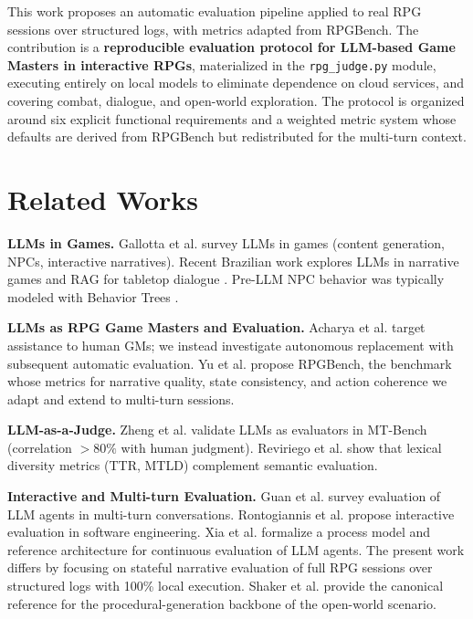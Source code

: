 \documentclass[12pt]{article}
\begin{document}
This work proposes an automatic evaluation pipeline applied to real RPG sessions over structured logs, with metrics adapted from RPGBench. The contribution is a \textbf{reproducible evaluation protocol for LLM-based Game Masters in interactive RPGs}, materialized in the \texttt{rpg\_judge.py} module, executing entirely on local models to eliminate dependence on cloud services, and covering combat, dialogue, and open-world exploration. The protocol is organized around six explicit functional requirements and a weighted metric system whose defaults are derived from RPGBench but redistributed for the multi-turn context.

\section{Related Works}
\label{sec:related}

\textbf{LLMs in Games.}
Gallotta et al. \cite{gallotta:2024} survey LLMs in games (content generation, NPCs, interactive narratives). Recent Brazilian work explores LLMs in narrative games \cite{sbgames:llm:2025} and RAG for tabletop dialogue \cite{sbgames:tabletop:2025}. Pre-LLM NPC behavior was typically modeled with Behavior Trees \cite{agis:2020}.

\textbf{LLMs as RPG Game Masters and Evaluation.}
Acharya et al. \cite{acharya:2023} target assistance to human GMs; we instead investigate autonomous replacement with subsequent automatic evaluation. Yu et al. \cite{yu:2025} propose RPGBench, the benchmark whose metrics for narrative quality, state consistency, and action coherence we adapt and extend to multi-turn sessions.

\textbf{LLM-as-a-Judge.}
Zheng et al. \cite{zheng:2023} validate LLMs as evaluators in MT-Bench (correlation $>80\%$ with human judgment). Reviriego et al. \cite{reviriego:2024} show that lexical diversity metrics (TTR, MTLD) complement semantic evaluation.

\textbf{Interactive and Multi-turn Evaluation.}
Guan et al. \cite{guan:2025} survey evaluation of LLM agents in multi-turn conversations. Rontogiannis et al. \cite{rontogiannis:2025} propose interactive evaluation in software engineering. Xia et al. \cite{xia:2024} formalize a process model and reference architecture for continuous evaluation of LLM agents. The present work differs by focusing on stateful narrative evaluation of full RPG sessions over structured logs with 100\% local execution. Shaker et al. \cite{shaker:2016} provide the canonical reference for the procedural-generation backbone of the open-world scenario.
\end{document}
